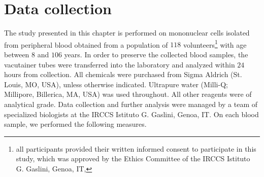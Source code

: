\section{Data collection} \label{sec:frassoni_data_collection}

The study presented in this chapter is performed on mononuclear cells isolated from peripheral blood obtained from a population of $118$ volunteers\footnote{all participants provided their written informed consent to participate in this study, which was approved by the Ethics Committee of the IRCCS Istituto G. Gaslini, Genoa, IT, } with age between $8$ and $106$ years.
In order to preserve the collected blood samples, the vacutainer tubes were transferred into the laboratory and analyzed within $24$ hours from collection.
All chemicals were purchased from Sigma Aldrich (St. Louis, MO, USA), unless otherwise indicated. Ultrapure water (Milli-Q; Millipore, Billerica, MA, USA) was used throughout. All other reagents were of analytical grade.
Data collection and further analysis were managed by a team of specialized biologists at the IRCCS Istituto G. Gaslini, Genoa, IT. On each blood sample, we performed the following measures.

